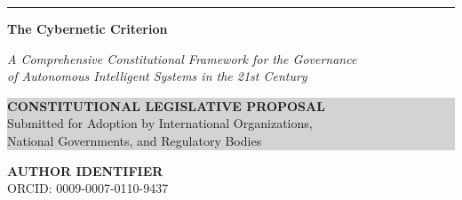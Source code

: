 \documentclass[12pt,a4paper,twoside,openright]{book}
\begin{document}
\begin{titlepage}
\vspace{0.6cm}

{\color{accentgold}\rule{0.75\textwidth}{2.5pt}}

\vspace{0.8cm}

{\Large\sffamily\bfseries\textcolor{legislativeblue}{The Cybernetic Criterion}\par}

\vspace{0.4cm}

{\large\itshape
A Comprehensive Constitutional Framework for the Governance\\[3pt]
of Autonomous Intelligent Systems in the 21st Century\par}

\vspace{1.8cm}

\noindent\colorbox{lightgray}{%
    \parbox{0.88\textwidth}{%
        \vspace{14pt}
        \centering
        {\Large\sffamily\bfseries CONSTITUTIONAL LEGISLATIVE PROPOSAL}\\[4pt]
        {\normalsize\sffamily Submitted for Adoption by International Organizations,}\\[2pt]
        {\normalsize\sffamily National Governments, and Regulatory Bodies}
        \vspace{14pt}
    }%
}

\vfill

\begin{minipage}[t]{0.46\textwidth}
    \raggedright
    \sffamily\small
    \textbf{\textcolor{legislativeblue}{AUTHOR IDENTIFIER}}\\[5pt]
    ORCID: 0009-0007-0110-9437
    
    \vspace{1cm}
    

\end{minipage}
\end{titlepage}
\end{document}
